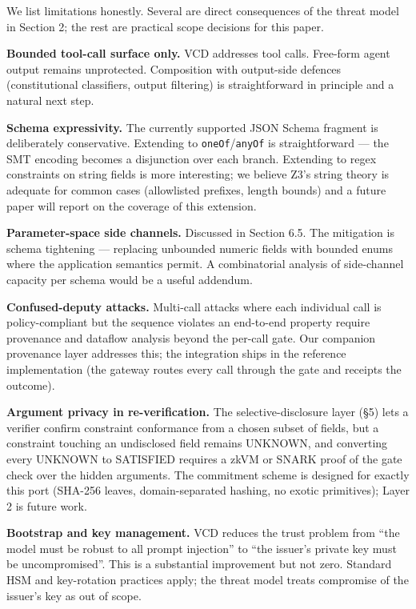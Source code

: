 We list limitations honestly. Several are direct consequences of the
threat model in Section 2; the rest are practical scope decisions for
this paper.

\textbf{Bounded tool-call surface only.} VCD addresses tool calls.
Free-form agent output remains unprotected. Composition with output-side
defences (constitutional classifiers, output filtering) is
straightforward in principle and a natural next step.

\textbf{Schema expressivity.} The currently supported JSON Schema
fragment is deliberately conservative. Extending to
\texttt{oneOf}/\texttt{anyOf} is straightforward --- the SMT encoding
becomes a disjunction over each branch. Extending to regex constraints
on string fields is more interesting; we believe Z3's string theory is
adequate for common cases (allowlisted prefixes, length bounds) and a
future paper will report on the coverage of this extension.

\textbf{Parameter-space side channels.} Discussed in Section 6.5. The
mitigation is schema tightening --- replacing unbounded numeric fields
with bounded enums where the application semantics permit. A
combinatorial analysis of side-channel capacity per schema would be a
useful addendum.

\textbf{Confused-deputy attacks.} Multi-call attacks where each
individual call is policy-compliant but the sequence violates an
end-to-end property require provenance and dataflow analysis beyond the
per-call gate. Our companion provenance layer addresses this; the
integration ships in the reference implementation (the gateway routes
every call through the gate and receipts the outcome).

\textbf{Argument privacy in re-verification.} The selective-disclosure
layer (§5) lets a verifier confirm constraint conformance from a chosen
subset of fields, but a constraint touching an undisclosed field remains
UNKNOWN, and converting every UNKNOWN to SATISFIED requires a zkVM or
SNARK proof of the gate check over the hidden arguments. The commitment
scheme is designed for exactly this port (SHA-256 leaves,
domain-separated hashing, no exotic primitives); Layer 2 is future work.

\textbf{Bootstrap and key management.} VCD reduces the trust problem
from ``the model must be robust to all prompt injection'' to ``the
issuer's private key must be uncompromised''. This is a substantial
improvement but not zero. Standard HSM and key-rotation practices apply;
the threat model treats compromise of the issuer's key as out of scope.

